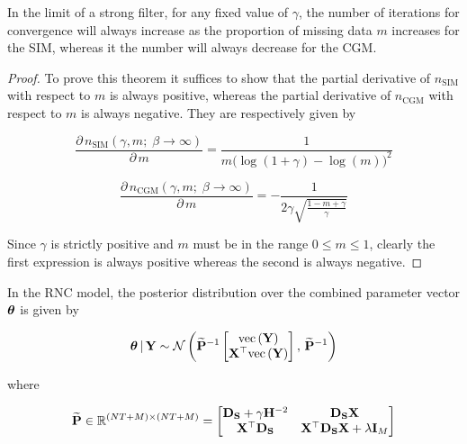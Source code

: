 \begin{theorem}
    \label{the:m_deriv}
    In the limit of a strong filter, for any fixed value of $\gamma$, the number of iterations for convergence will always increase as the proportion of missing data $m$ increases for the SIM, whereas it the number will always decrease for the CGM.  
\end{theorem}

\begin{proof}
    To prove this theorem it suffices to show that the partial derivative of $n_\text{SIM}$ with respect to $m$ is always positive, whereas the partial derivative of $n_\text{CGM}$ with respect to $m$ is always negative. They are respectively given by 

    \begin{equation*}
        \frac{\partial \,  n_{\text{SIM}}(\gamma, m ; \; \beta \rightarrow \infty)}{\partial \, m}  =  \frac{1}{m\big(\log(1 + \gamma) - \log(m) \big)^2}
    \end{equation*}
    
    \begin{equation*}
        \frac{\partial \,  n_{\text{CGM}}(\gamma, m ; \; \beta \rightarrow \infty)}{\partial \, m}  = - \frac{1}{2 \gamma \sqrt{\frac{1 - m + \gamma}{\gamma}}}
    \end{equation*}

    Since $\gamma$ is strictly positive and $m$ must be in the range $0 \leq m \leq 1$, clearly the first expression is always positive whereas the second is always negative. 
    
\end{proof}

\begin{theorem}
    \label{the:RNC_post}
    In the RNC model, the posterior distribution over the combined parameter vector $\boldsymbol{\theta}$ is given by 

    \begin{equation}
        \boldsymbol{\theta} \, | \, \mathbf{Y} \sim \mathcal{N}\left(\widetilde{\mathbf{P}}^{-1} \begin{bmatrix} \text{\textup{vec}}\left(\mathbf{Y}\right) \\ \mathbf{X}^\top \text{\textup{vec}}\left(\mathbf{Y}\right) \end{bmatrix}, \, \widetilde{\mathbf{P}}^{-1}\right)
    \end{equation}

    where 

    \begin{equation}
        \widetilde{\mathbf{P}} \in \mathbb{R}^{(NT + M) \times (NT + M)}= 
        \begin{bmatrix}
         \mathbf{D}_{\mathbf{S}} + \gamma \mathbf{H}^{-2} & \mathbf{D}_{\mathbf{S}}  \mathbf{X} \\
         \mathbf{X}^\top \mathbf{D}_{\mathbf{S}} & \mathbf{X}^\top \mathbf{D}_{\mathbf{S}} \mathbf{X} + \lambda \mathbf{I}_M   
        \end{bmatrix}
    \end{equation}

\end{theorem}


